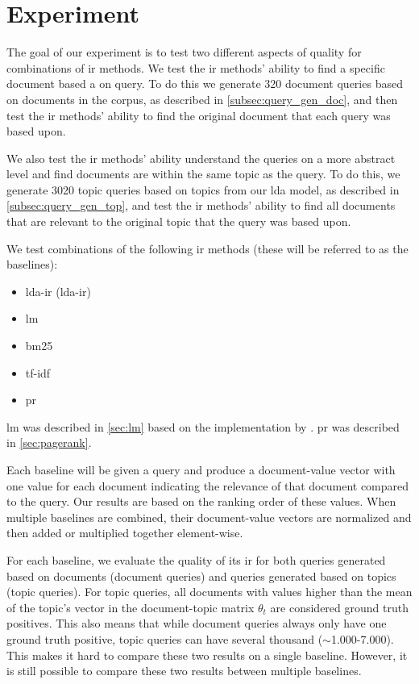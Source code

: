 \section{Experiment}\label{sec:experiment}

The goal of our experiment is to test two different aspects of quality for combinations of \gls{ir} methods.
We test the \gls{ir} methods' ability to find a specific document based a on query.
To do this we generate 320 document queries based on documents in the corpus, as described in \autoref{subsec:query_gen_doc}, and then test the \gls{ir} methods' ability to find the original document that each query was based upon.

We also test the \gls{ir} methods' ability understand the queries on a more abstract level and find documents are within the same topic as the query.
To do this, we generate 3020 topic queries based on topics from our \gls{lda} model, as described in \autoref{subsec:query_gen_top}, and test the \gls{ir} methods' ability to find all documents that are relevant to the original topic that the query was based upon.

We test combinations of the following \gls{ir} methods (these will be referred to as the baselines):
\begin{itemize}
	\item \acrlong{lda}-\acrlong{ir} (\acrshort{lda}-\acrshort{ir})
	\item \acrfull{lm}
	\item \acrfull{bm25}
	\item \acrfull{tf-idf}
	\item \acrfull{pr}
\end{itemize}

\gls{lm} was described in \autoref{sec:lm} based on the implementation by \citeauthor{yang2009topic}\cite{yang2009topic}.
\gls{pr} was described in \autoref{sec:pagerank}.



Each baseline will be given a query and produce a document-value vector with one value for each document indicating the relevance of that document compared to the query.
Our results are based on the ranking order of these values.
When multiple baselines are combined, their document-value vectors are normalized and then added or multiplied together element-wise.

For each baseline, we evaluate the quality of its \gls{ir} for both queries generated based on documents (document queries) and queries generated based on topics (topic queries).
For topic queries, all documents with values higher than the mean of the topic's vector in the document-topic matrix $\theta_t$ are considered ground truth positives.
This also means that while document queries always only have one ground truth positive, topic queries can have several thousand ($\sim$1.000-7.000).
This makes it hard to compare these two results on a single baseline.
However, it is still possible to compare these two results between multiple baselines.

